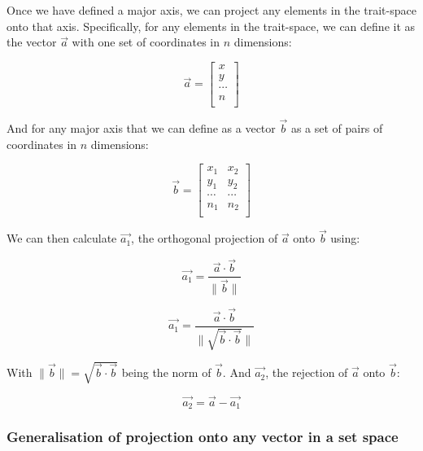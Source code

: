 \documentclass[12pt,letterpaper]{article}
\begin{document}
Once we have defined a major axis, we can project any elements in the trait-space onto that axis.
Specifically, for any elements in the trait-space, we can define it as the vector $\vec{a}$ with one set of coordinates in $n$ dimensions:

\begin{equation}
    \vec{a} = 
    \begin{bmatrix}
    x \\
    y \\
    \cdots \\
    n \\
    \end{bmatrix}
\end{equation}

And for any major axis that we can define as a vector $\vec{b}$ as a set of pairs of coordinates in $n$ dimensions:

\begin{equation}
    \vec{b} = 
    \begin{bmatrix}
    x_{1} & x_{2} \\
    y_{1} & y_{2} \\
    \cdots & \cdots \\
    n_{1} & n_{2} \\
    \end{bmatrix}
\end{equation}

We can then calculate $\vec{a_{1}}$, the orthogonal projection of $\vec{a}$ onto $\vec{b}$ using:

\begin{equation}
    \vec{a_{1}} = \frac{\vec{a} \cdot \vec{b}}{\|\vec{b}\|}
\end{equation}


\begin{equation}
    \vec{a_{1}} = \frac{\vec{a} \cdot \vec{b}}{\|\sqrt{\vec{b} \cdot \vec{b}}\|}
\end{equation}


With $\|\vec{b}\| = \sqrt{\vec{b} \cdot \vec{b}}$ being the norm of $\vec{b}$.
And $\vec{a_{2}}$, the rejection of $\vec{a}$ onto $\vec{b}$:

\begin{equation}
    \vec{a_{2}} = \vec{a} - \vec{a_{1}}
\end{equation}

\subsubsection{Generalisation of projection onto any vector in a set space}
\end{document}
